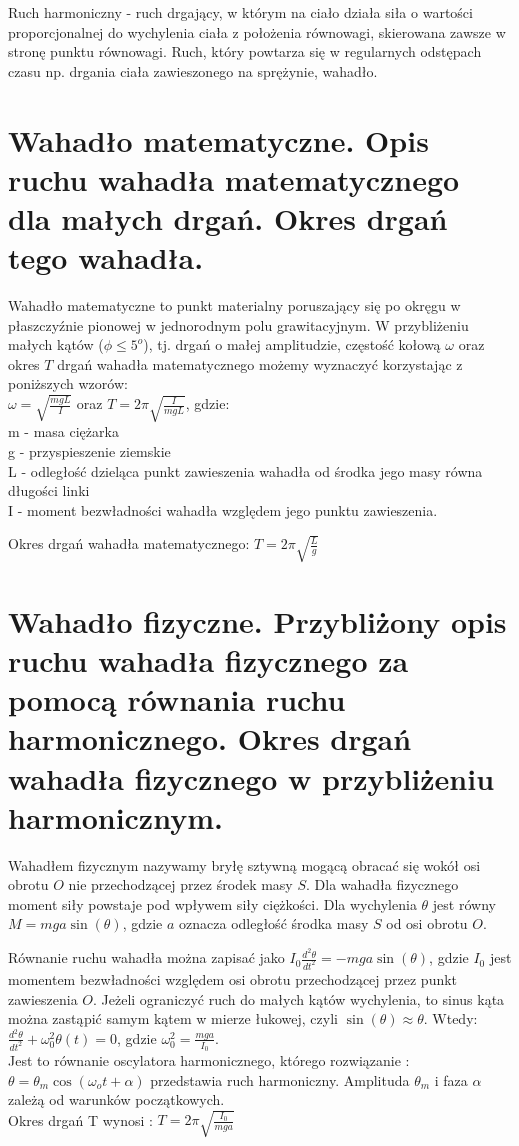\documentclass[a4paper,11pt]{article} %
\begin{document}
Ruch harmoniczny - ruch drgający, w którym na ciało działa siła o wartości proporcjonalnej do wychylenia ciała z położenia równowagi, skierowana zawsze w stronę punktu równowagi. Ruch, który powtarza się w regularnych odstępach czasu np. drgania ciała zawieszonego na sprężynie, wahadło.

{\color{red}{Dodać wzór na ruch harmoniczny}}

\section{Wahadło matematyczne. Opis ruchu wahadła matematycznego dla małych
drgań. Okres drgań tego wahadła.{\color{red}{Gotowe}}}

Wahadło matematyczne to punkt materialny poruszający się po okręgu w płaszczyźnie pionowej w jednorodnym polu grawitacyjnym.
W przybliżeniu małych kątów ($\phi \le 5^o$), tj. drgań o małej amplitudzie, częstość kołową $\omega$ oraz okres $T$ drgań wahadła matematycznego możemy wyznaczyć korzystając z poniższych wzorów:\\
$ \omega = \sqrt{\frac{mgL}{I}} $ oraz $ T = 2 \pi \sqrt{\frac{I}{mgL}}$, gdzie:\\
m - masa ciężarka\\
g - przyspieszenie ziemskie\\
L - odległość dzieląca punkt zawieszenia wahadła od środka jego masy równa długości linki\\
I - moment bezwładności wahadła względem jego punktu zawieszenia.

Okres drgań wahadła matematycznego: $T = 2\pi \sqrt{\frac{L}{g}}$

\section{Wahadło fizyczne. Przybliżony opis ruchu wahadła fizycznego za pomocą
równania ruchu harmonicznego. Okres drgań wahadła fizycznego w
przybliżeniu harmonicznym.{\color{red}{Gotowe}}}
Wahadłem fizycznym nazywamy bryłę sztywną mogącą obracać się wokół osi obrotu $O$ nie przechodzącej przez środek masy $S$. Dla wahadła fizycznego moment siły powstaje pod wpływem siły ciężkości. Dla wychylenia $\theta$ jest równy $M = mga\sin(\theta)$, gdzie $a$ oznacza odległość środka masy $S$ od osi obrotu $O$. 

Równanie ruchu wahadła można zapisać jako $I_0 \frac{d^2\theta}{dt^2} = -mga\sin(\theta)$, gdzie $I_0$ jest momentem bezwładności względem osi obrotu przechodzącej przez punkt zawieszenia $O$. Jeżeli ograniczyć ruch do małych kątów wychylenia, to sinus kąta można zastąpić samym kątem w mierze łukowej, czyli $\sin(\theta) \approx \theta$. Wtedy: \\
$\frac{d^2\theta}{dt^2} + \omega_0^2 \theta(t) = 0$, gdzie $\omega_0^2 = \frac{mga}{I_0}$.\\ Jest to równanie oscylatora harmonicznego, którego rozwiązanie : \\
$ \theta = \theta_m \cos(\omega_o t + \alpha)$ przedstawia ruch harmoniczny. Amplituda $\theta_m$ i faza $\alpha$ zależą od warunków początkowych. \\
Okres drgań T wynosi : $ T = 2 \pi \sqrt{\frac{I_0}{mga}}$
\end{document}
